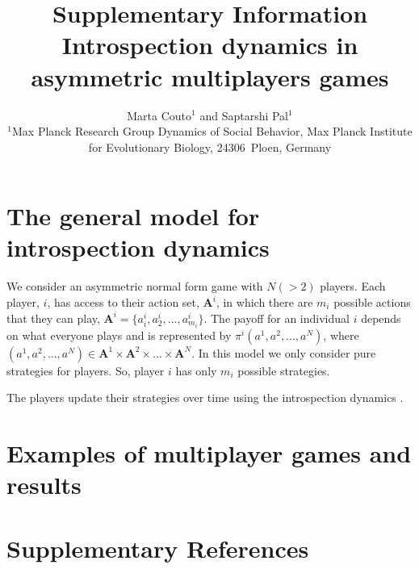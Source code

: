 \documentclass[11pt]{article}
\title{\sffamily \Large Supplementary Information\\[0.1cm] {\bfseries Introspection dynamics in asymmetric multiplayers games}}
\date{\empty}
\author{\parbox[c]{16cm}{\centering \onehalfspacing \fontsize{11}{12}\selectfont Marta Couto$^1$ and Saptarshi Pal$^1$\\[0.2cm]
$^1$Max Planck Research Group Dynamics of Social Behavior, Max Planck Institute for Evolutionary Biology, 24306~Ploen, Germany}}
\theoremstyle{plainCl1}
\theoremstyle{plainCl2}
\newcommand{\ai}{\mathbf{A}^i}
\begin{document}
\maketitle
\onehalfspacing
\section*{The general model for introspection dynamics}
We consider an asymmetric normal form game with $N (>2)$ players. Each player, $i$, has access to their action set, $\ai$, in which there are $m_i$ possible actions that they can play, $\ai = \{a^i_i, a^i_2, ..., a^i_{m_i}\}$. The payoff for an individual $i$ depends on what everyone plays and is represented by $\pi^i(a^1, a^2, ..., a^N)$, where $(a^1, a^2,...,a^N) \in \mathbf{A}^1 \times \mathbf{A}^2 \times ... \times \mathbf{A}^N$. In this model we only consider pure strategies for players. So, player $i$ has only $m_i$ possible strategies. 

\noindent The players update their strategies over time using the introspection dynamics \cite{couto2022introspection}. 

\section*{Examples of multiplayer games and results} 

\section*{Supplementary References}


\end{document}
